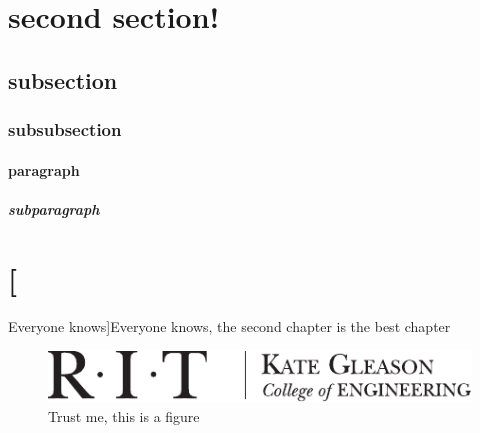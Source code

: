 \documentclass[microe]{ritthesis}
\providecommand{\chapter}[1]{\section{#1}}
\begin{document}
\section{second section!}

\subsection{subsection}

\subsubsection{subsubsection}

\paragraph{paragraph}

\subparagraph{subparagraph}

\lipsum{}
\chapter[Everyone knows]{Everyone knows, the second chapter is the best chapter}
\lipsum{}

\begin{figure}
\centering
\includegraphics{kgcoelogohoriz}
\caption{Trust me, this is a figure}
\label{fig:samp}
\end{figure}
\end{document}
